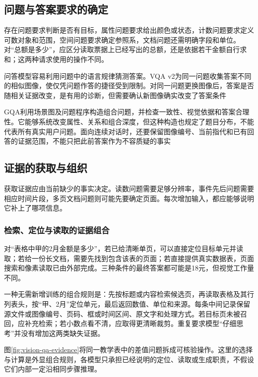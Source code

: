 \subsection{问题与答案要求的确定}
\label{sec:vision-understanding-question}

存在问题要求判断是否有目标，属性问题要求给出颜色或状态，计数问题要求定义可数对象和范围，空间问题要求确定参照系，文档问题还需明确字段和单位。对“总额是多少”，应区分读取票据上已经写出的总额，还是依据若干金额自行求和；这两种请求使用的操作不同。

问答模型容易利用问题中的语言规律猜测答案。VQA v2为同一问题收集答案不同的相似图像，使仅凭问题作答的捷径受到限制。对同一问题更换图像后，答案是否随相关证据改变，是有用的诊断，但需要确认新图像确实改变了答案条件

GQA利用场景图及问题程序构造组合问题，并检查一致性、视觉依据和答案合理性。它能够系统改变属性、关系和组合深度，但这种构造也规定了题目分布，不能代表所有真实用户问题。面向连续对话时，还要保留图像编号、当前指代和已有回答的证据范围，不能只把此前答案作为不容质疑的事实

\subsection{证据的获取与组织}
\label{sec:vision-understanding-evidence}

获取证据应由当前缺少的事实决定。读数问题需要足够分辨率，事件先后问题需要相应时间片段，多页文档问题则可能先要确定页面。每次增加输入，都应能够说明它补上了哪项信息。

\subsubsection{检索、定位与读取的证据组合}
\label{sec:vision-understanding-evidence-composition}

对“表格中甲的2月金额是多少”，若已给清晰单页，可以直接定位目标单元并读取；若给一份长文档，需要先找到包含该表的页面；若直接提供真实数据表，页面搜索和像素读取已由外部完成。三种条件的最终答案都可能是18元，但视觉工作量不同。

一种无需新增训练的组合规则是：先按标题或内容检索候选页，再读取表格及其行列表头，按“甲、2月”定位单元，最后返回数值、单位和来源。每条中间记录保留源文件或图像编号、页码、框或时间区间、原文字和处理方式。若目标页未被召回，应补充检索；若小数点看不清，应取得更清晰裁剪。重复要求模型“仔细思考”并没有增加这两类缺失证据。

图\ref{fig:vision-qa-evidence}将同一教学表中的差值问题拆成可核验操作。这里的选择与计算是外显组合规则，各模型只承担已经说明的定位、读取或生成职责，不假设它们内部一定沿相同步骤推理。

